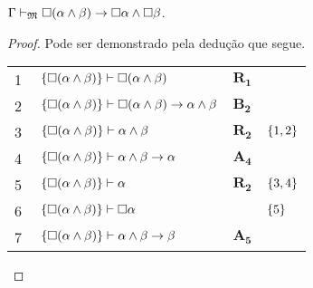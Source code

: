 \vspace{.5\baselineskip}
\begin{tcolorbox}[enhanced jigsaw, breakable, sharp corners, colframe=black, colback=white, boxrule=0.5pt, left=1.5mm, right=1.5mm, top=1.5mm, bottom=1.5mm]
    \begin{lemma}\label{necessity.conjunction.distribution}
        $\Gamma\mathrel{\vdash}_\mathfrak{M}\Box(\alpha\wedge\beta)\to\Box\alpha\wedge\Box\beta$.
        \begin{proof}
        Pode ser demonstrado pela dedução que segue.

        \vspace{0.5\baselineskip}
        \footnotesize
        \setlength{\rowskip}{0.5\baselineskip}
        \begin{xltabular}{\textwidth}{r | X l l}
            \scriptsize{\phantom{0}1}\phantom{ } & $\ \set{\nec(\alpha\wedge\beta)}\vdash\nec(\alpha\wedge\beta)$                            & $\hyperref[modal.rule.1]{\mathbf{R_1}}$        & \\[\rowskip]
            \scriptsize{\phantom{0}2}\phantom{ } & $\ \set{\nec(\alpha\wedge\beta)}\vdash\nec(\alpha\wedge\beta)\to\alpha\wedge\beta$        & $\hyperref[modal.axiom.modal.2]{\mathbf{B_2}}$ & \\[\rowskip]
            \scriptsize{\phantom{0}3}\phantom{ } & $\ \set{\nec(\alpha\wedge\beta)}\vdash\alpha\wedge\beta$                                  & $\hyperref[modal.rule.2]{\mathbf{R_2}}$        & $\left\{1,2\right\}$\\[\rowskip]
            \scriptsize{\phantom{0}4}\phantom{ } & $\ \set{\nec(\alpha\wedge\beta)}\vdash\alpha\wedge\beta\to\alpha$                         & $\hyperref[modal.axiom.4]{\mathbf{A_4}}$       & \\[\rowskip]
            \scriptsize{\phantom{0}5}\phantom{ } & $\ \set{\nec(\alpha\wedge\beta)}\vdash\alpha$                                             & $\hyperref[modal.rule.2]{\mathbf{R_2}}$        & $\left\{3,4\right\}$\\[\rowskip]
            \scriptsize{\phantom{0}6}\phantom{ } & $\ \set{\nec(\alpha\wedge\beta)}\vdash\nec\alpha$                                         & \phantom{1}           & $\left\{5\right\}$\\[\rowskip]
            \scriptsize{\phantom{0}7}\phantom{ } & $\ \set{\nec(\alpha\wedge\beta)}\vdash\alpha\wedge\beta\to\beta$                          & $\hyperref[modal.axiom.5]{\mathbf{A_5}}$       & \\[\rowskip]

\end{xltabular}
\end{proof}
\end{lemma}
\end{tcolorbox}
